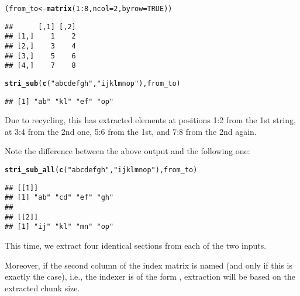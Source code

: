 \documentclass[nojss]{jss}\usepackage[]{graphicx}\usepackage[]{xcolor}
\makeatletter
\newcommand{\hlnum}[1]{\textcolor[rgb]{0.686,0.059,0.569}{#1}}%
\newcommand{\hlstr}[1]{\textcolor[rgb]{0.192,0.494,0.8}{#1}}%
\newcommand{\hlopt}[1]{\textcolor[rgb]{0,0,0}{#1}}%
\newcommand{\hlstd}[1]{\textcolor[rgb]{0.345,0.345,0.345}{#1}}%
\newcommand{\hlkwb}[1]{\textcolor[rgb]{0.69,0.353,0.396}{#1}}%
\newcommand{\hlkwc}[1]{\textcolor[rgb]{0.333,0.667,0.333}{#1}}%
\newcommand{\hlkwd}[1]{\textcolor[rgb]{0.737,0.353,0.396}{\textbf{#1}}}%
\newenvironment{kframe}{%
 \def\at@end@of@kframe{}%
 \ifinner\ifhmode%
  \def\at@end@of@kframe{\end{minipage}}%
  \begin{minipage}{\columnwidth}%
 \fi\fi%
 \def\FrameCommand##1{\hskip\@totalleftmargin \hskip-\fboxsep
 \colorbox{shadecolor}{##1}\hskip-\fboxsep
     \hskip-\linewidth \hskip-\@totalleftmargin \hskip\columnwidth}%
 \MakeFramed {\advance\hsize-\width
   \@totalleftmargin\z@ \linewidth\hsize
   \@setminipage}}%
 {\par\unskip\endMakeFramed%
 \at@end@of@kframe}
\newenvironment{knitrout}{}{} %
\makeatother
\begin{document}
\begin{knitrout}
\color{fgcolor}\begin{kframe}
\begin{alltt}
\hlstd{(from_to} \hlkwb{<-} \hlkwd{matrix}\hlstd{(}\hlnum{1}\hlopt{:}\hlnum{8}\hlstd{,} \hlkwc{ncol}\hlstd{=}\hlnum{2}\hlstd{,} \hlkwc{byrow}\hlstd{=}\hlnum{TRUE}\hlstd{))}
\end{alltt}
\begin{verbatim}
##      [,1] [,2]
## [1,]    1    2
## [2,]    3    4
## [3,]    5    6
## [4,]    7    8
\end{verbatim}
\begin{alltt}
\hlkwd{stri_sub}\hlstd{(}\hlkwd{c}\hlstd{(}\hlstr{"abcdefgh"}\hlstd{,} \hlstr{"ijklmnop"}\hlstd{), from_to)}
\end{alltt}
\begin{verbatim}
## [1] "ab" "kl" "ef" "op"
\end{verbatim}
\end{kframe}
\end{knitrout}

\noindent
Due to recycling, this has extracted
elements at positions 1:2 from the 1st string,
at 3:4 from the 2nd one, 5:6 from the 1st, and 7:8 from the 2nd again.

Note the difference between the above output and the following one:

\begin{knitrout}
\color{fgcolor}\begin{kframe}
\begin{alltt}
\hlkwd{stri_sub_all}\hlstd{(}\hlkwd{c}\hlstd{(}\hlstr{"abcdefgh"}\hlstd{,} \hlstr{"ijklmnop"}\hlstd{), from_to)}
\end{alltt}
\begin{verbatim}
## [[1]]
## [1] "ab" "cd" "ef" "gh"
## 
## [[2]]
## [1] "ij" "kl" "mn" "op"
\end{verbatim}
\end{kframe}
\end{knitrout}

This time, we extract four identical sections from each of the two inputs.


\medskip
Moreover, if the second column of the index matrix is named
 (and only if this is exactly the case),
i.e., the indexer is of the form ,
extraction will be based on the extracted chunk size.
\end{document}
